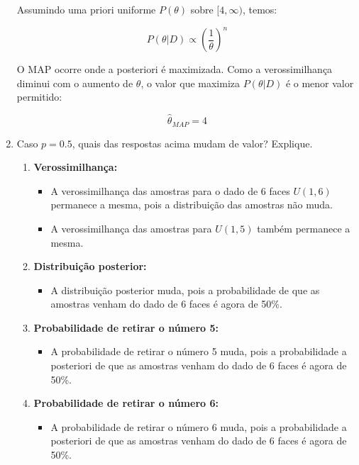 \documentclass[12 pt]{article}
\begin{document}
\begin{enumerate}
\begin{tcolorbox}[colback=white, colframe=black, title=Resposta:]
        Assumindo uma priori uniforme \( P(\theta) \) sobre \( [4, \infty) \), temos:
    
        \[
        P(\theta | D) \propto \left( \frac{1}{\theta} \right)^n
        \]
    
        O MAP ocorre onde a posteriori é maximizada. Como a verossimilhança diminui com o aumento de \( \theta \), o valor que maximiza \( P(\theta | D) \) é o menor valor permitido:
    
        \[
        \hat{\theta}_{MAP} = 4
        \]
    
    \end{tcolorbox}
    \newpage
    \item Caso $p = 0.5$, quais das respostas acima mudam de valor? Explique.
    \begin{tcolorbox}[colback=white, colframe=black, title=Resposta:]
        \begin{enumerate}
            \item \textbf{Verossimilhança:}
            \begin{itemize}
                \item A verossimilhança das amostras para o dado de 6 faces \( U(1,6) \) permanece a mesma, pois a distribuição das amostras não muda.
                \item A verossimilhança das amostras para \( U(1,5) \) também permanece a mesma.
            \end{itemize}
            \item \textbf{Distribuição posterior:}
            \begin{itemize}
                \item A distribuição posterior muda, pois a probabilidade de que as amostras venham do dado de 6 faces é agora de 50\%.
            \end{itemize}
            \item \textbf{Probabilidade de retirar o número 5:}
            \begin{itemize}
                \item A probabilidade de retirar o número 5 muda, pois a probabilidade a posteriori de que as amostras venham do dado de 6 faces é agora de 50\%.
            \end{itemize}
            \item \textbf{Probabilidade de retirar o número 6:}
            \begin{itemize}
                \item A probabilidade de retirar o número 6 muda, pois a probabilidade a posteriori de que as amostras venham do dado de 6 faces é agora de 50\%.

\end{itemize}
\end{enumerate}
\end{tcolorbox}
\end{enumerate}
\end{document}

